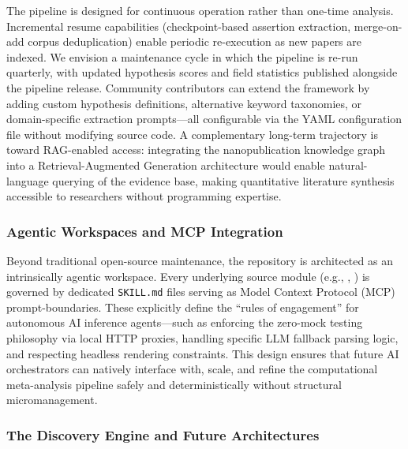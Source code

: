 \documentclass[
  english,
]{article}
\begin{document}
The pipeline is designed for continuous operation rather than one-time
analysis. Incremental resume capabilities (checkpoint-based assertion
extraction, merge-on-add corpus deduplication) enable periodic
re-execution as new papers are indexed. We envision a maintenance cycle
in which the pipeline is re-run quarterly, with updated hypothesis
scores and field statistics published alongside the pipeline release.
Community contributors can extend the framework by adding custom
hypothesis definitions, alternative keyword taxonomies, or
domain-specific extraction prompts---all configurable via the YAML
configuration file without modifying source code. A complementary
long-term trajectory is toward RAG-enabled access: integrating the
nanopublication knowledge graph into a Retrieval-Augmented Generation
architecture \citep{fan2024survey} would enable natural-language
querying of the evidence base, making quantitative literature synthesis
accessible to researchers without programming expertise.

\subsubsection{Agentic Workspaces and MCP
Integration}\label{agentic-workspaces-and-mcp-integration}

Beyond traditional open-source maintenance, the repository is
architected as an intrinsically agentic workspace. Every underlying
source module (e.g., ,
) is governed by dedicated \texttt{SKILL.md}
files serving as Model Context Protocol (MCP) prompt-boundaries. These
explicitly define the ``rules of engagement'' for autonomous AI
inference agents---such as enforcing the zero-mock testing philosophy
via local HTTP proxies, handling specific LLM fallback parsing logic,
and respecting headless rendering constraints. This design ensures that
future AI orchestrators can natively interface with, scale, and refine
the computational meta-analysis pipeline safely and deterministically
without structural micromanagement.

\subsubsection{The Discovery Engine and Future
Architectures}\label{the-discovery-engine-and-future-architectures}
\end{document}
